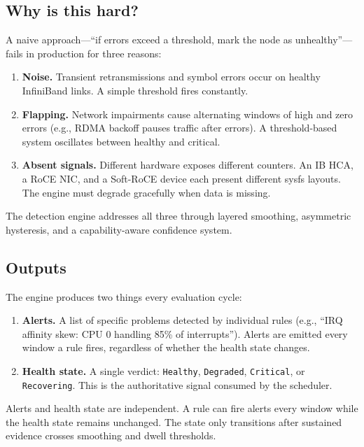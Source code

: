 \documentclass[11pt]{article}
\begin{document}
\subsection{Why is this hard?}

A naive approach---``if errors exceed a threshold, mark the node as
unhealthy''---fails in production for three reasons:

\begin{enumerate}
  \item \textbf{Noise.} Transient retransmissions and symbol errors occur on
        healthy InfiniBand links. A simple threshold fires constantly.
  \item \textbf{Flapping.} Network impairments cause alternating windows of
        high and zero errors (e.g., RDMA backoff pauses traffic after errors).
        A threshold-based system oscillates between healthy and critical.
  \item \textbf{Absent signals.} Different hardware exposes different counters.
        An IB HCA, a RoCE NIC, and a Soft-RoCE device each present different
        sysfs layouts. The engine must degrade gracefully when data is missing.
\end{enumerate}

The detection engine addresses all three through layered smoothing, asymmetric
hysteresis, and a capability-aware confidence system.

\subsection{Outputs}

The engine produces two things every evaluation cycle:

\begin{enumerate}
  \item \textbf{Alerts.} A list of specific problems detected by individual
        rules (e.g., ``IRQ affinity skew: CPU 0 handling 85\% of interrupts'').
        Alerts are emitted every window a rule fires, regardless of whether
        the health state changes.
  \item \textbf{Health state.} A single verdict:
        \texttt{Healthy},
        \texttt{Degraded},
        \texttt{Critical}, or
        \texttt{Recovering}.
        This is the authoritative signal consumed by the scheduler.
\end{enumerate}

\begin{keyinsight}
  Alerts and health state are independent. A rule can fire alerts every window
  while the health state remains unchanged. The state only transitions after
  sustained evidence crosses smoothing and dwell thresholds.
\end{keyinsight}
\end{document}
